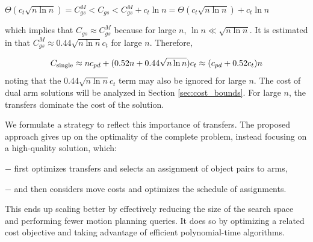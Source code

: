 {\centerline
{
$\Theta(c_t\sqrt{n\ln n}) = C_{gs}^M < C_{gs} < C_{gs}^M + c_t\ln n 
= \Theta(c_t\sqrt{n\ln n}) + c_t\ln n$
}
}

\noindent which implies that $C_{gs} \approx C_{gs}^M$ because for large $n$, $\ln n
\ll \sqrt{n\ln n}$. It is estimated in \cite{yu2015target} that $C_{gs}^M 
\approx 0.44\sqrt{n\ln n}c_t$ for large $n$. Therefore, 

\vspace{-0.1in}
\begin{equation}\label{eq:single-cost-simple}
C_{\rm single} \approx nc_{pd} + (0.52n + 0.44\sqrt{n\ln n})c_t \approx (c_{pd} + 0.52c_t)n
\end{equation}
noting that the $0.44\sqrt{n\ln n}c_t$ term may also be ignored for large $n$. The cost of dual arm solutions will be analyzed in Section \ref{sec:cost_bounds}.
{
\lemma For large $n$, the transfers dominate the cost of the solution.
\label{lem:transferdomination}
}

We formulate a strategy to reflect this importance of transfers.
The proposed approach gives up on the optimality of the complete problem, instead focusing on a high-quality solution, which:
\begin{myitem}
\item[$-$] first optimizes transfers and selects an assignment of object pairs to arms, 
\item[$-$] and then considers move costs and optimizes the schedule of assignments.
\end{myitem} 
This ends up scaling better by effectively reducing the size of the search space and performing fewer motion planning queries. It does so by optimizing a related cost objective and taking advantage of efficient polynomial-time algorithms. 


